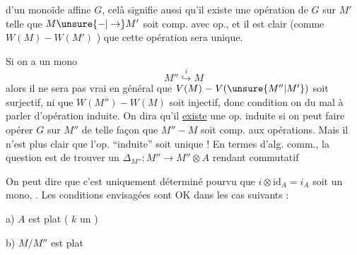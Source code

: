 d'un monoïde affine $G$, celà signifie aussi qu'il existe une opération de $G$ sur $M'$  telle que $M\unsure{-|\to}M'$ soit comp. avec  op., et il est clair  (comme $W(M)\mathrel{-}W(M')$ ) que cette opération sera unique.

Si on a un mono
\[
M''\overset{i}{\hookrightarrow}M
\]
alors il ne sera pas vrai en général que $V(M)\mathrel{-}V(\unsure{M''|M'})$ soit surjectif, ni que $W(M'')\mathrel{-}W(M)$ soit injectif, donc   condition on  du mal à parler d'opération induite.
 On dira qu'il \uline{existe} une op. induite si on peut faire opérer $G$ sur $M''$ de telle façon que $M''\mathrel{-}M$ soit comp. aux opérations.
Mais il n'est plus clair que l'op. ``induite'' soit unique ! En termes d'alg. comm., la question est de trouver un $\Delta_{M''}:M''\to M''\otimes A$ rendant commutatif

On peut dire que c'est uniquement déterminé pourvu que $i\otimes{\mathrm{id}}_A=i_A$ soit un mono,
. Les conditions envisagées sont OK dans les cas suivants :

a) $A$ est plat ( $k$ un )

b) $M/M''$ est  plat

